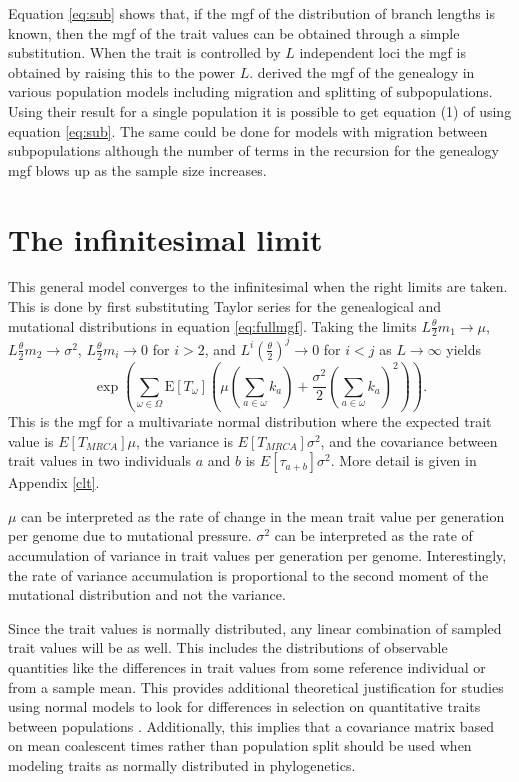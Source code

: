 \documentclass{article}
\newcommand{\T}{\frac{\theta}{2}}
\newcommand{\E}{\mathrm{E}}
\begin{document}
Equation \eqref{eq:sub} shows that, if the mgf of the distribution of branch
lengths is known, then the mgf of the trait values can be obtained through a
simple substitution. When the trait is controlled by $L$ independent loci the
mgf is obtained by raising this to the power $L$. \citet{Lohse2011} derived the
mgf of the genealogy in various population models including migration and
splitting of subpopulations. Using their result for a single population it is
possible to get equation (1) of \citet{Schraiber2015} using equation
\eqref{eq:sub}. The same could be done for models with migration between
subpopulations although the number of terms in the recursion for the genealogy
mgf blows up as the sample size increases.
\section{The infinitesimal limit}
This general model converges to the infinitesimal when the right limits are
taken. This is done by first substituting Taylor series for the genealogical and
mutational distributions in equation \eqref{eq:fullmgf}. Taking the limits $L\T
m_1 \to \mu$, $L\T m_2\to \sigma^2$, $L\T m_i\to 0$ for $i>2$, and
$L^i\left(\T\right)^j \to 0$ for $i<j$ as $L\to \infty$ yields
\begin{equation}
  \label{eq:clt}
  \exp \left( \sum_{\omega \in \Omega}\E[T_{\omega}] \left( \mu \left(
  \sum_{a \in \omega} k_a\right) + \frac{\sigma^2}{2}\left( \sum_{a \in \omega}
  k_a\right)^2\right)\right).
\end{equation}
This is the mgf for a multivariate normal distribution where the expected trait
value is $E[T_{MRCA}] \mu$, the variance is $E[T_{MRCA}]\sigma^2$, and the
covariance between trait values in two individuals $a$ and $b$ is
$E[\tau_{a+b}] \sigma^2$. More detail is given in Appendix \ref{clt}.

$\mu$ can be interpreted as the rate of change in the mean trait value per
generation per genome due to mutational pressure. $\sigma^2$ can be interpreted
as the rate of accumulation of variance in trait values per generation per
genome. Interestingly, the rate of variance accumulation is proportional to the
second moment of the mutational distribution and not the variance.

Since the trait values is normally distributed, any linear combination of
sampled trait values will be as well. This includes the distributions of
observable quantities like the differences in trait values from some reference
individual or from a sample mean. This provides additional theoretical
justification for studies using normal models to look for differences in
selection on quantitative traits between populations
\citep{Ovaskainen2011,Praebel2013,Robinson2015}. Additionally, this implies that
a covariance matrix based on mean coalescent times rather than population split
should be used when modeling traits as normally distributed in phylogenetics.
\end{document}
